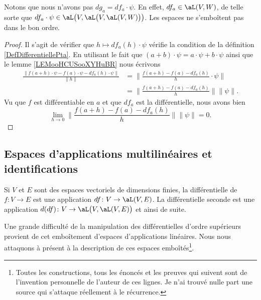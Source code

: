 Notons que nous n'avons pas \( dg_a=df_a\cdot \psi\). En effet, \( df_a\in \aL( V,W )\), de telle sorte que \( df_a\cdot\psi\in \aL\big( V,\aL\big( V,\aL(V,W) \big) \big)\). Les espaces ne s'emboîtent pas dans le bon ordre.

\begin{proof}
    Il s'agit de vérifier que \( h\mapsto df_a(h)\cdot \psi\) vérifie la condition de la définition \ref{DefDifferentiellePta}. En utilisant le fait que \( (a+b)\cdot \psi = a\cdot \psi+b\cdot \psi\) ainsi que le lemme \ref{LEMooHCUSooXYHuBR} nous écrivons
    \begin{subequations}
        \begin{align}
            \frac{ \| f(a+h)\cdot \psi-f(a)\cdot\psi-df_a(h)\cdot \psi\|  }{ \| h \| }&=\| \frac{ f(a+h)-f(a)-df_a(h) }{ h  }\cdot \psi\| \\
            &=\| \frac{ f(a+h)-f(a)-df_a(h) }{ h } \|\| \psi \|.
        \end{align}
    \end{subequations}
    Vu que \( f\) est différentiable en \( a\) et que \( df_a\) est la différentielle, nous avons bien
    \begin{equation}
        \lim_{h\to 0}  \| \frac{ f(a+h)-f(a)-df_a(h) }{ h } \|\| \psi \|=0.
    \end{equation}
\end{proof}


\subsection{Espaces d'applications multilinéaires et identifications}

Si \( V\) et \( E\) sont des espaces vectoriels de dimensions finies, la différentielle de \( f\colon V\to E\) est une application \( df\colon V\to \aL(V,E)\). La différentielle seconde est une application \( d(df)\colon V\to \aL\big( V,\aL(V,E) \big)\) et ainsi de suite.

Une grande difficulté de la manipulation des différentielles d'ordre supérieurs provient de cet emboîtement d'espaces d'applications linéaires. Nous nous attaquons à présent à la description de ces espaces emboîtés\footnote{Toutes les constructions, tous les énoncés et les preuves qui suivent sont de l'invention personnelle de l'auteur de ces lignes. Je n'ai trouvé nulle part une source qui s'attaque réellement à le récurrence.}.

